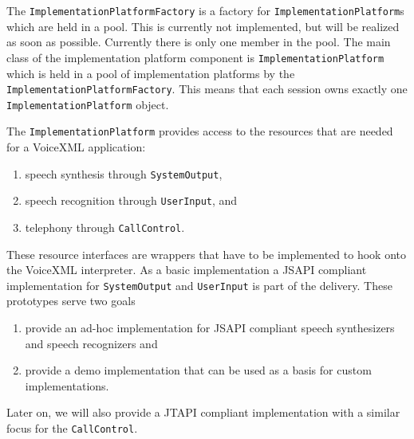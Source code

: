 \documentclass[11pt,a4paper]{article}
\begin{document}
The \texttt{ImplementationPlatformFactory} is a factory for
\texttt{Im\-ple\-men\-tation\-Plat\-form}s which are held in a pool.
This is currently not implemented, but will be realized as soon as possible.
Currently there is only one member in the pool.
The main class of the implementation platform component is 
\texttt{Im\-ple\-men\-tat\-ion\-Plat\-form} which is held in a pool of 
implementation
platforms by the \texttt{Im\-plementat\-ionPlat\-form\-Factory}. This means
that each session owns exactly one \texttt{Im\-plemen\-tat\-ionPlat\-form}
object.

The \texttt{ImplementationPlatform} provides access to the resources that are
needed for a VoiceXML application:
\begin{enumerate}
  \item speech synthesis through \texttt{SystemOutput},
  \item speech recognition through \texttt{UserInput}, and
  \item telephony through \texttt{CallControl}.
\end{enumerate}
\begin{center}
\end{center}
These resource interfaces are wrappers that have to be implemented to hook onto
the VoiceXML interpreter. As a basic implementation a JSAPI compliant
implementation for \texttt{SystemOutput} and \texttt{UserInput} is part of the
delivery. These prototypes serve two goals
\begin{enumerate}
  \item provide an ad-hoc implementation for JSAPI compliant speech synthesizers
  and speech recognizers and
  \item provide a demo implementation that can be used as a basis for custom
  implementations. 
\end{enumerate}
Later on, we will also provide a JTAPI compliant implementation with a similar
focus for the \texttt{CallControl}.
\end{document}
